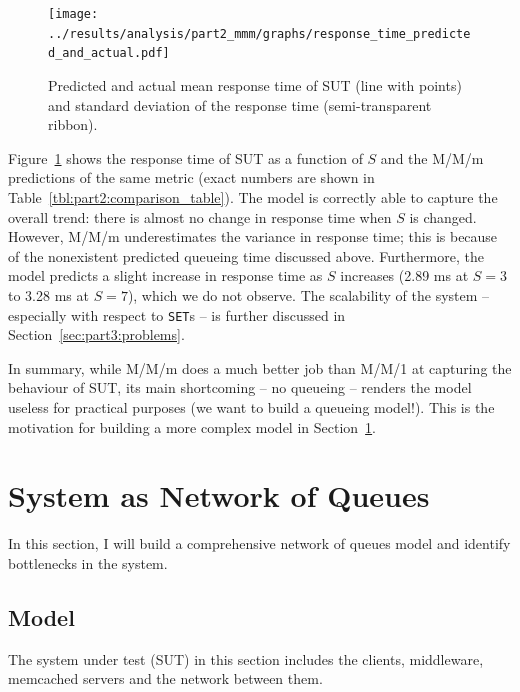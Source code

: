 \documentclass[11pt]{article}
\newcommand{\set}[0]{\texttt{SET}}
\begin{document}
\begin{figure}[h]
\centering
\texttt{[image: ../results/analysis/part2\_mmm/graphs/response\_time\_predicted\_and\_actual.pdf]}
\caption{Predicted and actual mean response time of SUT (line with points) and standard deviation of the response time (semi-transparent ribbon).}
\label{fig:part2:responsetime}
\end{figure}

Figure~\ref{fig:part2:responsetime} shows the response time of SUT as a function of $S$ and the M/M/m predictions of the same metric (exact numbers are shown in Table~\ref{tbl:part2:comparison_table}). The model is correctly able to capture the overall trend: there is almost no change in response time when $S$ is changed. However, M/M/m underestimates the variance in response time; this is because of the nonexistent predicted queueing time discussed above. Furthermore, the model predicts a slight increase in response time as $S$ increases (2.89 ms at $S=3$ to 3.28 ms at $S=7$), which we do not observe. The scalability of the system -- especially with respect to \set{}s -- is further discussed in Section~\ref{sec:part3:problems}.

In summary, while M/M/m does a much better job than M/M/1 at capturing the behaviour of SUT, its main shortcoming -- no queueing -- renders the model useless for practical purposes (we want to build a queueing model!). This is the motivation for building a more complex model in Section~\ref{sec:part3-network-of-queues}.

\clearpage
\section{System as Network of Queues}\label{sec:part3-network-of-queues}

In this section, I will build a comprehensive network of queues model and identify bottlenecks in the system.

\subsection{Model}

The system under test (SUT) in this section includes the clients, middleware, memcached servers and the network between them.
\end{document}
